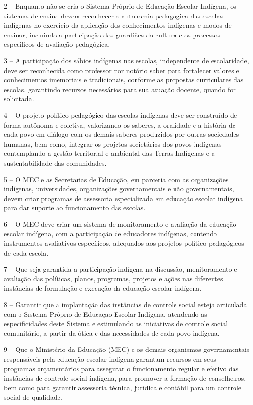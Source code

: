 \documentclass[
]{book}
\begin{document}
2 -- Enquanto não se cria o Sistema Próprio de Educação Escolar Indígena, os sistemas de ensino devem reconhecer a autonomia pedagógica das escolas indígenas no exercício da aplicação dos conhecimentos indígenas e modos de ensinar, incluindo a participação dos guardiões da cultura e os processos específicos de avaliação pedagógica.

3 -- A participação dos sábios indígenas nas escolas, independente de escolaridade, deve ser reconhecida como professor por notório saber para fortalecer valores e conhecimentos imemoriais e tradicionais, conforme as propostas curriculares das escolas, garantindo recursos necessários para sua atuação docente, quando for solicitada.

4 -- O projeto político-pedagógico das escolas indígenas deve ser construído de forma autônoma e coletiva, valorizando os saberes, a oralidade e a história de cada povo em diálogo com os demais saberes produzidos por outras sociedades humanas, bem como, integrar os projetos societários dos povos indígenas contemplando a gestão territorial e ambiental das Terras Indígenas e a sustentabilidade das comunidades.

5 -- O MEC e as Secretarias de Educação, em parceria com as organizações indígenas, universidades, organizações governamentais e não governamentais, devem criar programas de assessoria especializada em educação escolar indígena para dar suporte ao funcionamento das escolas.

6 -- O MEC deve criar um sistema de monitoramento e avaliação da educação escolar indígena, com a participação de educadores indígenas, contendo instrumentos avaliativos específicos, adequados aos projetos político-pedagógicos de cada escola.

7 -- Que seja garantida a participação indígena na discussão, monitoramento e avaliação das políticas, planos, programas, projetos e ações nas diferentes instâncias de formulação e execução da educação escolar indígena.

8 -- Garantir que a implantação das instâncias de controle social esteja articulada com o Sistema Próprio de Educação Escolar Indígena, atendendo as especificidades deste Sistema e estimulando as iniciativas de controle social comunitário, a partir da ótica e das necessidades de cada povo indígena.

9 -- Que o Ministério da Educação (MEC) e os demais organismos governamentais responsáveis pela educação escolar indígena garantam recursos em seus programas orçamentários para assegurar o funcionamento regular e efetivo das instâncias de controle social indígena, para promover a formação de conselheiros, bem como para garantir assessoria técnica, jurídica e contábil para um controle social de qualidade.
\end{document}
